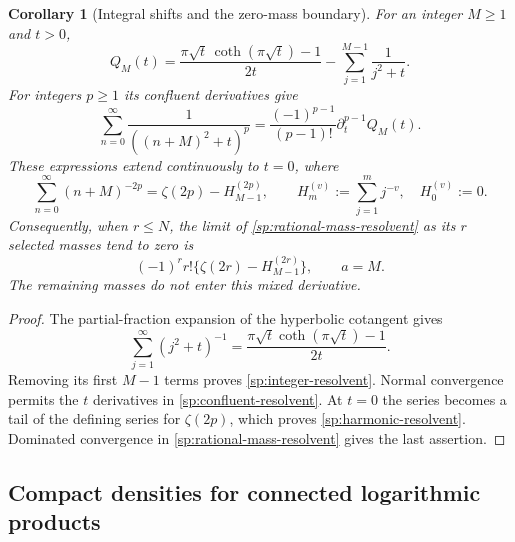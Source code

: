 \documentclass[11pt,letterpaper]{article}
\numberwithin{equation}{section}
\newtheorem{corollary}[theorem]{Corollary}
\theoremstyle{definition}
\theoremstyle{remark}
\begin{document}
\begin{corollary}[Integral shifts and the zero-mass boundary]
\label{sp:integer-a}
For an integer $M\geq1$ and $t>0$,
\begin{equation}
 Q_M(t)=\frac{\pi\sqrt t\,\coth(\pi\sqrt t)-1}{2t}
           -\sum_{j=1}^{M-1}\frac{1}{j^2+t}.
 \label{sp:integer-resolvent}
\end{equation}
For integers $p\geq1$ its confluent derivatives give
\begin{equation}
 \sum_{n=0}^{\infty}\frac{1}{((n+M)^2+t)^p}
 =\frac{(-1)^{p-1}}{(p-1)!}\partial_t^{p-1}Q_M(t).
 \label{sp:confluent-resolvent}
\end{equation}
These expressions extend continuously to $t=0$, where
\begin{equation}
 \sum_{n=0}^{\infty}(n+M)^{-2p}
    =\zeta(2p)-H_{M-1}^{(2p)},
 \qquad H_m^{(v)}:=\sum_{j=1}^{m}j^{-v},\quad H_0^{(v)}:=0.
 \label{sp:harmonic-resolvent}
\end{equation}
Consequently, when $r\leq N$, the limit of
\eqref{sp:rational-mass-resolvent} as its $r$ selected masses tend
to zero is
\begin{equation}
 (-1)^r r!\{\zeta(2r)-H_{M-1}^{(2r)}\},\qquad a=M.
 \label{sp:harmonic-mixed-jet}
\end{equation}
The remaining masses do not enter this mixed derivative.
\end{corollary}

\begin{proof}
The partial-fraction expansion of the hyperbolic cotangent gives
\[
 \sum_{j=1}^{\infty}(j^2+t)^{-1}
       =\frac{\pi\sqrt t\coth(\pi\sqrt t)-1}{2t}.
\]
Removing its first $M-1$ terms proves
\eqref{sp:integer-resolvent}.  Normal convergence permits the
$t$ derivatives in \eqref{sp:confluent-resolvent}.  At $t=0$ the
series becomes a tail of the defining series for $\zeta(2p)$,
which proves \eqref{sp:harmonic-resolvent}.  Dominated convergence
in \eqref{sp:rational-mass-resolvent} gives the last assertion.
\end{proof}

\subsection{Compact densities for connected logarithmic products}
\label{sp:connected-subsection}
\end{document}

